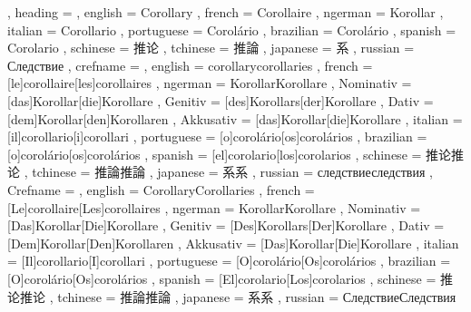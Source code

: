   {
    , heading =   {
                    , english     = Corollary
                    , french      = Corollaire
                    , ngerman     = Korollar
                    , italian     = Corollario
                    , portuguese  = Corolário
                    , brazilian   = Corolário
                    , spanish     = Corolario
                    , schinese    = 推论
                    , tchinese    = 推論
                    , japanese    = 系
                    , russian     = Следствие
                  }
    , crefname =  {
                    , english     = {corollary}{corollaries}
                    , french      = [le]{corollaire}[les]{corollaires}
                    , ngerman     = { {Korollar}{Korollare}
                                      , Nominativ = [das]{Korollar}[die]{Korollare}
                                      , Genitiv   = [des]{Korollars}[der]{Korollare}
                                      , Dativ     = [dem]{Korollar}[den]{Korollaren}
                                      , Akkusativ = [das]{Korollar}[die]{Korollare}
                                    }
                    , italian     = [il]{corollario}[i]{corollari}
                    , portuguese  = [o]{corolário}[os]{corolários}
                    , brazilian   = [o]{corolário}[os]{corolários}
                    , spanish     = [el]{corolario}[los]{corolarios}
                    , schinese    = {推论}{推论}
                    , tchinese    = {推論}{推論}
                    , japanese    = {系}{系}
                    , russian     = {следствие}{следствия}
                  }
    , Crefname =  {
                    , english     = {Corollary}{Corollaries}
                    , french      = [Le]{corollaire}[Les]{corollaires}
                    , ngerman     = { {Korollar}{Korollare}
                                      , Nominativ = [Das]{Korollar}[Die]{Korollare}
                                      , Genitiv   = [Des]{Korollars}[Der]{Korollare}
                                      , Dativ     = [Dem]{Korollar}[Den]{Korollaren}
                                      , Akkusativ = [Das]{Korollar}[Die]{Korollare}
                                    }
                    , italian     = [Il]{corollario}[I]{corollari}
                    , portuguese  = [O]{corolário}[Os]{corolários}
                    , brazilian   = [O]{corolário}[Os]{corolários}
                    , spanish     = [El]{corolario}[Los]{corolarios}
                    , schinese    = {推论}{推论}
                    , tchinese    = {推論}{推論}
                    , japanese    = {系}{系}
                    , russian     = {Следствие}{Следствия}
                  }
  }

